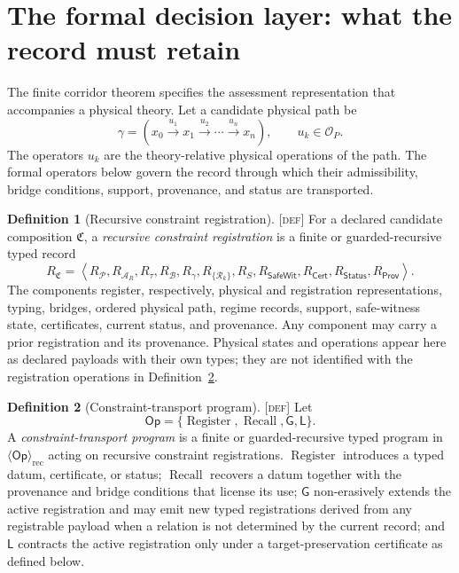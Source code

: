 \documentclass[11pt]{article}
\newcommand{\Pspace}{\ensuremath{\mathcal{P}}}
\newcommand{\ARspace}{\ensuremath{\mathcal{A}_{R}}}
\newcommand{\Register}{\ensuremath{\operatorname{Register}}}
\newcommand{\Recall}{\ensuremath{\operatorname{Recall}}}
\newcommand{\GOp}{\ensuremath{\mathsf{G}}}
\newcommand{\LOp}{\ensuremath{\mathsf{L}}}
\newcommand{\OpBasis}{\ensuremath{\mathsf{Op}}}
\newcommand{\Defn}{\textsc{[def]}}
\theoremstyle{definition}
\newtheorem{sdefinition}{Definition}
\begin{document}
\section{The formal decision layer: what the record must retain}
\label{supp:calculus}

The finite corridor theorem specifies the assessment representation that
accompanies a physical theory. Let a candidate physical path be
\begin{equation}
\gamma=
\left(
 x_0\xrightarrow{u_1}x_1\xrightarrow{u_2}\cdots
 \xrightarrow{u_n}x_n
\right),
\qquad u_k\in\mathcal O_P.
\label{eq:physical-path-supp}
\end{equation}
The operators $u_k$ are the theory-relative physical operations of the path. The
formal operators below govern the record through which their admissibility, bridge
conditions, support, provenance, and status are transported.

\begin{sdefinition}[Recursive constraint registration]
\label{def:recursive-constraint-registration}
\Defn{} For a declared candidate composition $\mathfrak C$, a
\emph{recursive constraint registration} is a finite or guarded-recursive typed
record
\begin{equation}
R_{\mathfrak C}=
\left\langle
R_{\Pspace},R_{\ARspace},R_{\tau},R_{\mathcal B},R_{\gamma},
R_{\{\mathcal R_k\}},R_S,R_{\mathsf{SafeWit}},
R_{\mathsf{Cert}},R_{\mathsf{Status}},R_{\mathsf{Prov}}
\right\rangle .
\label{eq:recursive-constraint-registration}
\end{equation}
The components register, respectively, physical and registration representations,
typing, bridges, ordered physical path, regime records, support, safe-witness
state, certificates, current status, and provenance. Any component may carry a
prior registration and its provenance. Physical states and operations appear here
as declared payloads with their own types; they are not identified with the
registration operations in Definition~\ref{def:constraint-program}.
\end{sdefinition}

\begin{sdefinition}[Constraint-transport program]
\label{def:constraint-program}
\Defn{} Let
\begin{equation}
\OpBasis=\{\Register,\Recall,\GOp,\LOp\}.
\label{eq:constraint-operator-basis}
\end{equation}
A \emph{constraint-transport program} is a finite or guarded-recursive typed
program in $\langle\OpBasis\rangle_{\mathrm{rec}}$ acting on recursive constraint
registrations. $\Register$ introduces a typed datum, certificate, or status;
$\Recall$ recovers a datum together with the provenance and bridge conditions that
license its use; $\GOp$ non-erasively extends the active registration and may emit
new typed registrations derived from any registrable payload when a relation is not
determined by the current record; and $\LOp$ contracts the active registration
only under a target-preservation certificate as defined below.
\end{sdefinition}
\end{document}
